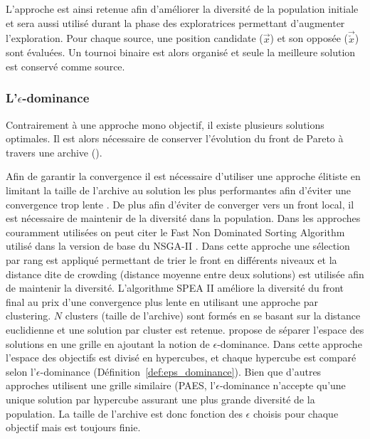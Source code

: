 L’approche est ainsi retenue afin d’améliorer la diversité de la population initiale
et sera aussi utilisé durant la phase des exploratrices permettant d’augmenter l’exploration.
Pour chaque source, une position candidate ($\vec{x}$) et son opposée ($\vec{\check{x}}$) sont évaluées.
Un tournoi binaire est alors organisé et seule la meilleure solution est conservé comme source.


\subsubsection{L’$\epsilon$-dominance} %
\label{ssub:epsilon_dominance}
Contrairement à une approche mono objectif, il existe plusieurs solutions optimales.
Il est alors nécessaire de conserver l’évolution du front de Pareto à travers une
archive ().


Afin de garantir la convergence il est nécessaire d’utiliser une approche élitiste
en limitant la taille de l’archive au solution les plus performantes afin d’éviter
une convergence trop lente \parencite{Zitzler2000173}. De plus afin d’éviter de converger vers un front local,
il est nécessaire de maintenir de la diversité dans la population.
Dans les approches couramment utilisées on peut citer le Fast Non Dominated Sorting Algorithm utilisé dans la version
de base du NSGA-II \parencite{Deb2002182}. Dans cette approche une sélection par rang
est appliqué permettant de trier le front en différents niveaux et la distance dite
de crowding (distance moyenne entre deux solutions) est utilisée afin de maintenir la diversité.
L’algorithme SPEA II améliore la diversité du front final au prix d’une convergence
plus lente en utilisant une approche par clustering. $N$ clusters (taille de l’archive)
sont formés en se basant sur la distance euclidienne et une solution par cluster
est retenue.
\cite{Laumanns2002263} propose de séparer l’espace des solutions en une grille en ajoutant la notion
de $\epsilon$-dominance. Dans cette approche l’espace des objectifs est divisé en hypercubes,
et chaque hypercube est comparé selon l’$\epsilon$-dominance (Définition~\ref{def:eps_dominance}).
Bien que d’autres approches utilisent une grille similaire (PAES, \cite{Knowles2000149}
l’$\epsilon$-dominance n’accepte qu’une unique solution par hypercube assurant une
plus grande diversité de la population. La taille de l’archive est donc fonction
des $\epsilon$ choisis pour chaque objectif mais est toujours finie.


